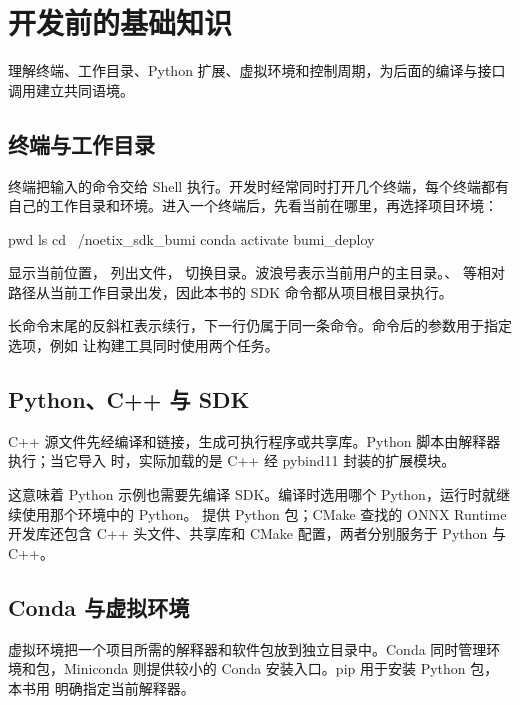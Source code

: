 \chapter{开发前的基础知识}

\begin{intro}
理解终端、工作目录、Python 扩展、虚拟环境和控制周期，为后面的编译与接口调用建立共同语境。
\end{intro}
\section{终端与工作目录}
终端把输入的命令交给 Shell 执行。开发时经常同时打开几个终端，每个终端都有自己的工作目录和环境。进入一个终端后，先看当前在哪里，再选择项目环境：
\par\noindent\begin{minipage}{\linewidth}
\begin{command}
pwd
ls
cd ~/noetix_sdk_bumi
conda activate bumi_deploy
\end{command}
\end{minipage}\par

 显示当前位置， 列出文件， 切换目录。波浪号表示当前用户的主目录。、 等相对路径从当前工作目录出发，因此本书的 SDK 命令都从项目根目录执行。

长命令末尾的反斜杠表示续行，下一行仍属于同一条命令。命令后的参数用于指定选项，例如  让构建工具同时使用两个任务。
\section{Python、C++ 与 SDK}
C++ 源文件先经编译和链接，生成可执行程序或共享库。Python 脚本由解释器执行；当它导入  时，实际加载的是 C++ 经 pybind11 封装的扩展模块。

这意味着 Python 示例也需要先编译 SDK。编译时选用哪个 Python，运行时就继续使用那个环境中的 Python。 提供 Python 包；CMake 查找的 ONNX Runtime 开发库还包含 C++ 头文件、共享库和 CMake 配置，两者分别服务于 Python 与 C++。
\section{Conda 与虚拟环境}
虚拟环境把一个项目所需的解释器和软件包放到独立目录中。Conda 同时管理环境和包，Miniconda 则提供较小的 Conda 安装入口。pip 用于安装 Python 包，本书用  明确指定当前解释器。

